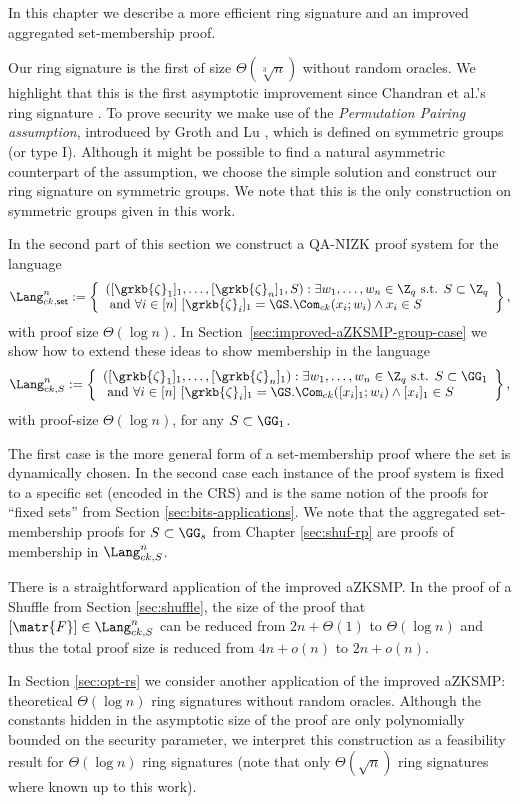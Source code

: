 In this chapter we describe a more efficient ring signature and an improved aggregated set-membership proof.

Our ring signature is the first of size $\Theta(\sqrt[3]{n})$ without random oracles. We highlight that this is the first asymptotic improvement since Chandran et al.'s ring signature \cite{ICALP:ChaGroSah07}. To prove security we make use of the \emph{Permutation Pairing assumption}, introduced by Groth and Lu \cite{AC:GroLu07}, which is defined on symmetric groups (or type I). Although it might be possible to find a natural asymmetric counterpart of the assumption, we choose the simple solution and construct our ring signature on symmetric groups. We note that this is the only construction on symmetric groups given in this work.

In the second part of this section we construct a QA-NIZK proof system for the language
\[
\Lang_{ck,\mathsf{set}}^n:=\left\{\begin{array}{l}
([\grkb{\zeta}_1]_1,\ldots,[\grkb{\zeta}_n]_1,S):\exists w_1,\ldots,w_n\in\Z_q \text{ s.t. } S\subset\Z_q\\
\text{ and } \forall i\in [n]\ [\grkb{\zeta}_i]_1=\GS.\Com_{ck}(x_i;w_i)\wedge x_i\in S
\end{array}\right\},
\]
with proof size $\Theta(\log n)$. In Section~\ref{sec:improved-aZKSMP-group-case} we show how to extend these ideas to show membership in the language
\[
\Lang_{ck,S}^n:=\left\{\begin{array}{l}
([\grkb{\zeta}_1]_1,\ldots,[\grkb{\zeta}_n]_1):\exists w_1,\ldots,w_n\in\Z_q \text{ s.t. } S\subset\GG_1 \\
\text{ and } \forall i\in [n]\ [\grkb{\zeta}_i]_1=\GS.\Com_{ck}([x_i]_1;w_i)\wedge [x_i]_1\in S
\end{array}\right\},
\]
with proof-size $\Theta(\log n)$, for any \(S\subset\GG_1\).

The first case is the more general form of a set-membership proof where the set is dynamically chosen. In the second case each instance of the proof system is fixed to a specific set (encoded in the CRS) and is the same notion of the proofs for ``fixed sets'' from Section \ref{sec:bits-applications}. We note that the aggregated set-membership proofs for $S\subset\GG_s$ from Chapter \ref{sec:shuf-rp} are proofs of membership in $\Lang_{ck,S}^n$.

There is a straightforward application of the improved aZKSMP. In the proof of a Shuffle from Section \ref{sec:shuffle}, the size of the proof that $[\matr{F}]\in\Lang_{ck,S}^n$ can be reduced from $2n+\Theta(1)$ to $\Theta(\log n)$ and thus the total proof size is reduced from $4n+o(n)$ to $2n+o(n)$.

In Section \ref{sec:opt-rs} we consider another application of the improved aZKSMP: theoretical $\Theta(\log n)$ ring signatures without random oracles. Although the constants hidden in the asymptotic size of the proof are only polynomially bounded on the security parameter, we interpret this construction as a feasibility result for $\Theta(\log n)$ ring signatures (note that only $\Theta(\sqrt{n})$ ring signatures where known up to this work).


